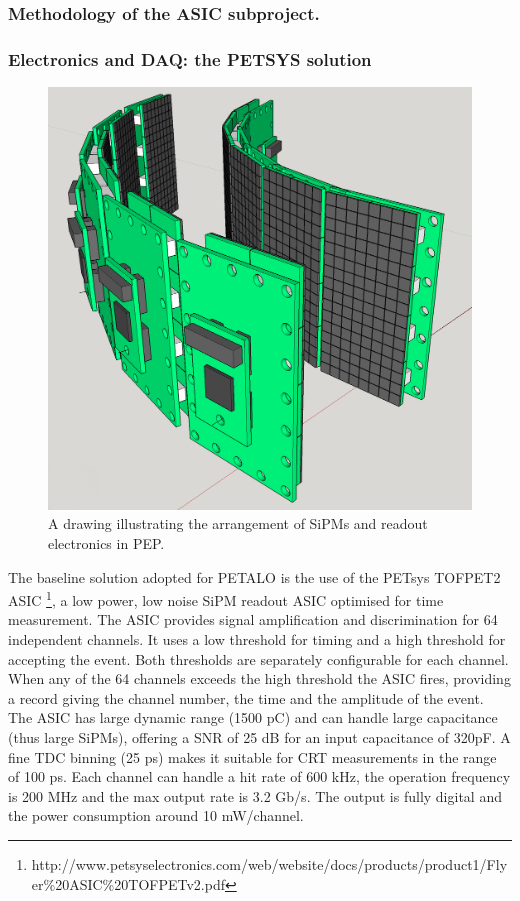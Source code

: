 \subsubsection*{Methodology of the ASIC subproject.}

\subsubsection*{Electronics and DAQ: the PETSYS solution}
%
\begin{figure}[!htb]
	\centering
	\includegraphics[scale=0.25]{img/PEP.png}
	\caption{\label{fig.pep} A drawing illustrating the arrangement of SiPMs and readout electronics in PEP. }
	\end{figure}

The baseline solution adopted for PETALO is the use of the PETsys TOFPET2 ASIC
\footnote{http://www.petsyselectronics.com/web/website/docs/products/product1/Flyer\%20ASIC\%20TOFPETv2.pdf}, a low power, low noise SiPM readout ASIC
optimised for  time measurement. The ASIC provides signal amplification and discrimination for 64 independent channels. It uses a low threshold
for  timing and a high threshold for accepting the event. Both thresholds are separately configurable for each channel. When any of the 64 channels exceeds the high threshold the ASIC fires, providing a record giving the channel number, the time and the amplitude of the event. The ASIC has large dynamic range (1500 pC) and can handle large
capacitance (thus large SiPMs), offering a SNR of 25 dB for an
input capacitance of 320pF. A fine TDC binning (25 ps) makes it suitable for CRT measurements in the range
of 100 ps. Each channel can handle a hit rate of 600 kHz, the operation frequency is 200 MHz and the max output
rate is 3.2 Gb/s. The output is fully digital and the power consumption around 10 mW/channel.

